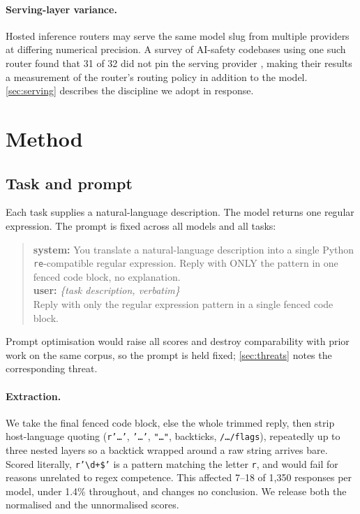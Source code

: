 \documentclass[11pt]{article}
\begin{document}
\paragraph{Serving-layer variance.}
Hosted inference routers may serve the same model slug from multiple
providers at differing numerical precision. A survey of AI-safety codebases
using one such router found that 31 of 32 did not pin the serving provider
\citep{openrouterpinning}, making their results a measurement of the router's
routing policy in addition to the model. \cref{sec:serving} describes the
discipline we adopt in response.

\section{Method}

\subsection{Task and prompt}

Each task supplies a natural-language description. The model returns one
regular expression. The prompt is fixed across all models and all tasks:

\begin{quote}\small
\textbf{system:} You translate a natural-language description into a single
Python \texttt{re}-compatible regular expression. Reply with ONLY the pattern
in one fenced code block, no explanation.\\[0.3em]
\textbf{user:} \textit{\{task description, verbatim\}}\\[0.3em]
Reply with only the regular expression pattern in a single fenced code block.
\end{quote}

Prompt optimisation would raise all scores and destroy comparability with
prior work on the same corpus, so the prompt is held fixed;
\cref{sec:threats} notes the corresponding threat.

\paragraph{Extraction.} We take the final fenced code block, else the whole
trimmed reply, then strip host-language quoting
(\texttt{r'\ldots'}, \texttt{'\ldots'}, \texttt{"\ldots"}, backticks,
\texttt{/\ldots/flags}), repeatedly up to three nested layers so a backtick
wrapped around a raw string arrives bare. Scored literally, \texttt{r'\textbackslash d+\$'} is
a pattern matching the letter \texttt{r}, and would fail for reasons
unrelated to regex competence. This affected 7--18 of 1{,}350 responses per
model, under 1.4\% throughout, and changes no conclusion. We release both the
normalised and the unnormalised scores.
\end{document}
